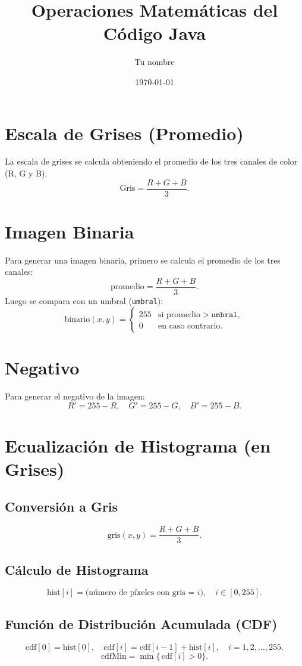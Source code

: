 \documentclass[11pt]{article}
\begin{document}
\title{Operaciones Matemáticas del Código Java}
\author{Tu nombre}
\date{\today}
\maketitle

\section{Escala de Grises (Promedio)}

La escala de grises se calcula obteniendo el promedio de los tres canales de color (R, G y B). 
\[
\text{Gris} = \frac{R + G + B}{3}.
\]

\section{Imagen Binaria}

Para generar una imagen binaria, primero se calcula el promedio de los tres canales:
\[
\text{promedio} = \frac{R + G + B}{3}.
\]
Luego se compara con un umbral (\texttt{umbral}):
\[
\text{binario}(x, y) = 
\begin{cases}
255 & \text{si } \text{promedio} > \texttt{umbral},\\
0   & \text{en caso contrario}.
\end{cases}
\]

\section{Negativo}
Para generar el negativo de la imagen:
\[
R' = 255 - R, 
\quad G' = 255 - G, 
\quad B' = 255 - B.
\]

\section{Ecualización de Histograma (en Grises)}

\subsection{Conversión a Gris}
\[
\text{gris}(x, y) = \frac{R + G + B}{3}.
\]

\subsection{Cálculo de Histograma}
\[
\text{hist}[i] = \text{(número de píxeles con gris = } i), \quad i \in [0, 255].
\]

\subsection{Función de Distribución Acumulada (CDF)}
\[
\text{cdf}[0] = \text{hist}[0], \quad
\text{cdf}[i] = \text{cdf}[i - 1] + \text{hist}[i], \quad i = 1, 2, \ldots, 255.
\]
\[
\text{cdfMin} = \min \bigl\{\,\text{cdf}[i] > 0\bigr\}.
\]
\end{document}
